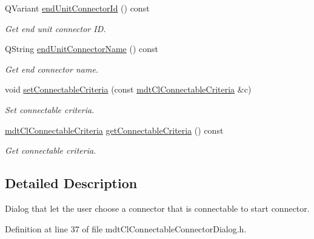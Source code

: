 \begin{DoxyCompactItemize}
Q\-Variant \hyperlink{classmdt_cl_connectable_connector_dialog_adcd8f308c0256de534cf731afd34ee31}{end\-Unit\-Connector\-Id} () const 
\begin{DoxyCompactList}\small\item\em Get end unit connector I\-D. \end{DoxyCompactList}\item 
Q\-String \hyperlink{classmdt_cl_connectable_connector_dialog_a782661ae1fae01f9838ef380436f6aaf}{end\-Unit\-Connector\-Name} () const 
\begin{DoxyCompactList}\small\item\em Get end connector name. \end{DoxyCompactList}\item 
void \hyperlink{classmdt_cl_connectable_connector_dialog_a9656e5aee8b62503d87529e901bf8602}{set\-Connectable\-Criteria} (const \hyperlink{structmdt_cl_connectable_criteria}{mdt\-Cl\-Connectable\-Criteria} \&c)
\begin{DoxyCompactList}\small\item\em Set connectable criteria. \end{DoxyCompactList}\item 
\hyperlink{structmdt_cl_connectable_criteria}{mdt\-Cl\-Connectable\-Criteria} \hyperlink{classmdt_cl_connectable_connector_dialog_a67ecdb0a1faa56cb3fa2abb9d69b9444}{get\-Connectable\-Criteria} () const 
\begin{DoxyCompactList}\small\item\em Get connectable criteria. \end{DoxyCompactList}\end{DoxyCompactItemize}


\subsection{Detailed Description}
Dialog that let the user choose a connector that is connectable to start connector. 

Definition at line 37 of file mdt\-Cl\-Connectable\-Connector\-Dialog.\-h.



